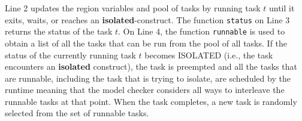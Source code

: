 Line 2 updates the region variables and pool of tasks by running task $t$ until it exits, waits, or reaches an \textbf{isolated}-construct. The function \texttt{status} on Line 3 returns the status of the task $t$. On Line 4, the function \texttt{runnable} is used to obtain a list of all the tasks that can be run from the pool of all tasks. If the status of the currently running task $t$ becomes ISOLATED (i.e., the task encounters an \textbf{isolated} construct), the task is preempted and all the tasks that are runnable, including the task that is trying to isolate, are scheduled by the runtime meaning that the model checker considers all ways to interleave the runnable tasks at that point. When the task completes, a new task is randomly selected from the set of runnable tasks.

